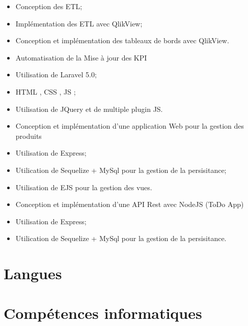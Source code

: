 \documentclass[11pt,a4paper]{moderncv}
\begin{document}
{%
\begin{itemize}%
	\item Conception des ETL;
	\item Implémentation des ETL avec QlikView;
	\item Conception et implémentation des tableaux de bords avec QlikView.
\end{itemize}}
%
{%
\begin{itemize}%
	\item Automatisation de la Mise à jour des KPI
	\item Utilisation de Laravel 5.0;
	\item HTML , CSS , JS ;
	\item Utilisation de JQuery et de multiple plugin JS.
\end{itemize}}
%
{%
\begin{itemize}%
	\item Conception et implémentation d'une application Web pour la gestion des produits 
	\item Utilisation de Express;
	\item Utilication de Sequelize + MySql pour la gestion de la persisitance;
	\item Utilisation de EJS pour la gestion des vues.
\end{itemize}}
%
{%
\begin{itemize}%
	\item Conception et implémentation d'une API Rest avec NodeJS (ToDo App)
	\item Utilisation de Express;
	\item Utilication de Sequelize + MySql pour la gestion de la persisitance.
\end{itemize}}
\section{Langues}
\newpage
\section{Compétences informatiques}
\end{document}
